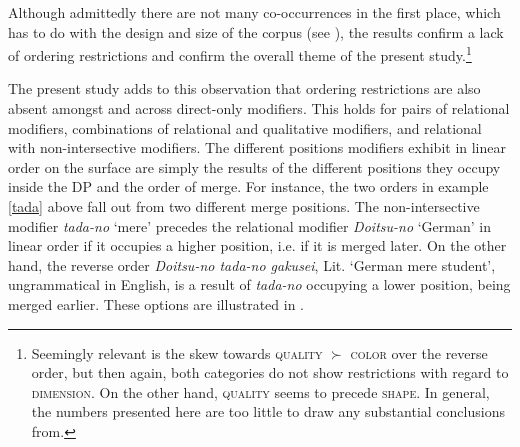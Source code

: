  Although admittedly there are not many co-occurrences in the first place, which has to do with the design and size of the corpus (see \citealt{kohlich:2023:suppl}), the results confirm a lack of ordering restrictions and confirm the overall theme of the present study.\footnote{Seemingly relevant is the skew towards \textsc{quality} $\succ$ \textsc{color} over the reverse order, but then again, both categories do not show restrictions with regard to \textsc{dimension}. On the other hand, \textsc{quality} seems to precede \textsc{shape}. In general, the numbers presented here are too little to draw any substantial conclusions from.} 

The present study adds to this observation that ordering restrictions are also absent amongst and across direct-only modifiers. This holds for pairs of relational modifiers, combinations of relational and qualitative modifiers, and relational with non-intersective modifiers. The different positions modifiers exhibit in linear order on the surface are simply the results of the different positions they occupy inside the DP and the order of merge. For instance, the two orders in example \ref{tada} above fall out from two different merge positions. The non-intersective modifier \textit{tada-no} `mere’ precedes the relational modifier \textit{Doitsu-no} `German’ in linear order if it occupies a higher position, i.e. if it is merged later. On the other hand, the reverse order \textit{Doitsu-no tada-no gakusei}, Lit. `German mere student', ungrammatical in English, is a result of \textit{tada-no} occupying a lower position, being merged earlier. These options are illustrated in .

